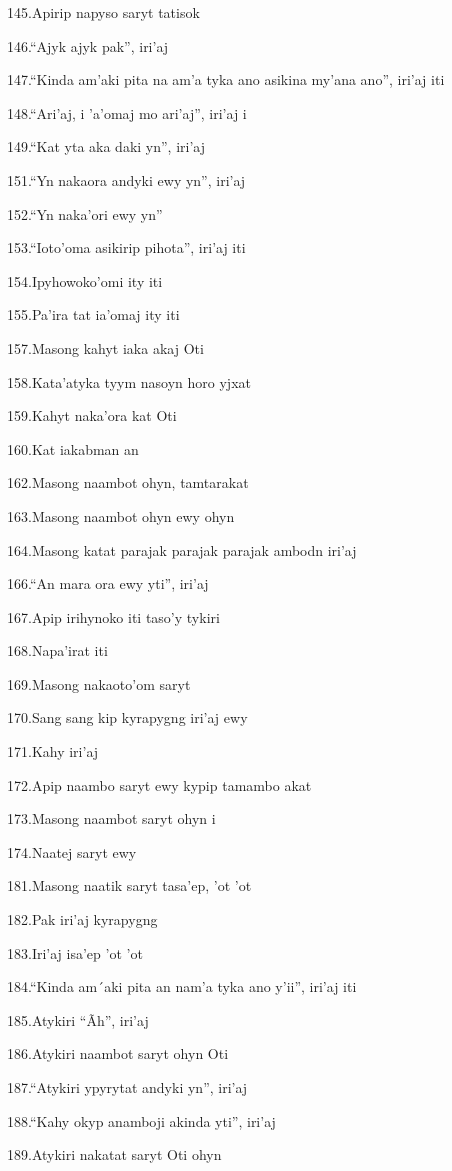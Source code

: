 145.Apirip napyso saryt tatisok

146.``Ajyk ajyk pak'', iri'aj

147.``Kinda am'aki pita na am'a tyka ano asikina my'ana ano'', iri'aj
iti

148.``Ari'aj, i 'a'omaj mo ari'aj'', iri'aj i

149.``Kat yta aka daki yn'', iri'aj

151.``Yn nakaora andyki ewy yn'', iri'aj

152.``Yn naka'ori ewy yn''

153.``Ioto'oma asikirip pihota'', iri'aj iti

154.Ipyhowoko'omi ity iti

155.Pa'ira tat ia'omaj ity iti

157.Masong kahyt iaka akaj Oti

158.Kata'atyka tyym nasoyn horo yjxat

159.Kahyt naka'ora kat Oti

160.Kat iakabman an

162.Masong naambot ohyn, tamtarakat

163.Masong naambot ohyn ewy ohyn

164.Masong katat parajak parajak parajak ambodn iri'aj

166.``An mara ora ewy yti'', iri'aj

167.Apip irihynoko iti taso'y tykiri

168.Napa'irat iti

169.Masong nakaoto'om saryt

170.Sang sang kip kyrapygng iri'aj ewy

171.Kahy iri'aj

172.Apip naambo saryt ewy kypip tamambo akat

173.Masong naambot saryt ohyn i

174.Naatej saryt ewy

181.Masong naatik saryt tasa'ep, 'ot 'ot

182.Pak iri'aj kyrapygng

183.Iri'aj isa'ep 'ot 'ot

184.``Kinda am´aki pita an nam'a tyka ano y'ii'', iri'aj iti

185.Atykiri ``Ãh'', iri'aj

186.Atykiri naambot saryt ohyn Oti

187.``Atykiri ypyrytat andyki yn'', iri'aj

188.``Kahy okyp anamboji akinda yti'', iri'aj

189.Atykiri nakatat saryt Oti ohyn


